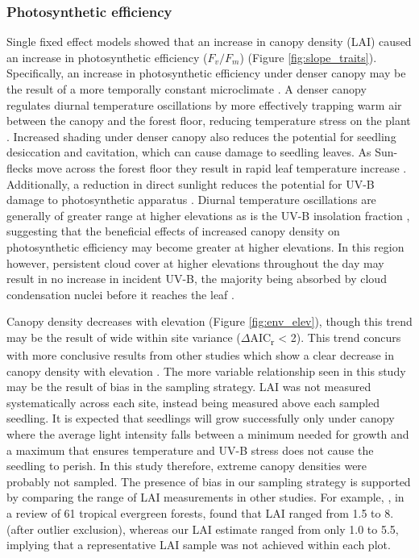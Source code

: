 \documentclass[a4paper, 11pt]{article}
\begin{document}
\subsubsection*{Photosynthetic efficiency}

Single fixed effect models showed that an increase in canopy density (LAI) caused an increase in photosynthetic efficiency ($F_v/F_m$) (Figure \ref{fig:slope_traits}). Specifically, an increase in photosynthetic efficiency under denser canopy may be the result of a more temporally constant microclimate \citep{Amissah2015}. A denser canopy regulates diurnal temperature oscillations by more effectively trapping warm air between the canopy and the forest floor, reducing temperature stress on the plant \citep{Larcher2003}. Increased shading under denser canopy also reduces the potential for seedling desiccation and cavitation, which can cause damage to seedling leaves. As Sun-flecks move across the forest floor they result in rapid leaf temperature increase \citep{Rozendaal2006, Poorter2010}. Additionally, a reduction in direct sunlight reduces the potential for UV-B damage to photosynthetic apparatus \citep{Dobrikova2013}. Diurnal temperature oscillations are generally of greater range at higher elevations \citep{Seidel2005} as is the UV-B insolation fraction \citep{Piazena1996}, suggesting that the beneficial effects of increased canopy density on photosynthetic efficiency may become greater at higher elevations. In this region however, persistent cloud cover at higher elevations throughout the day may result in no increase in incident UV-B, the majority being absorbed by cloud condensation nuclei before it reaches the leaf \citep{Flint2003}.

Canopy density decreases with elevation (Figure \ref{fig:env_elev}), though this trend may be the result of wide within site variance ($\Delta$AIC\textsubscript{r} < 2). This trend concurs with more conclusive results from other studies which show a clear decrease in canopy density with elevation \citep{Kitayama2002, Moser2008}. The more variable relationship seen in this study may be the result of bias in the sampling strategy. LAI was not measured systematically across each site, instead being measured above each sampled seedling. It is expected that seedlings will grow successfully only under canopy where the average light intensity falls between a minimum needed for growth and a maximum that ensures temperature and UV-B stress does not cause the seedling to perish. In this study therefore, extreme canopy densities were probably not sampled. The presence of bias in our sampling strategy is supported by comparing the range of LAI measurements in other studies. For example, \citet{Asner2003}, in a review of 61 tropical evergreen forests, found that LAI ranged from 1.5 to 8. (after outlier exclusion), whereas our LAI estimate ranged from only 1.0 to 5.5, implying that a representative LAI sample was not achieved within each plot.
\end{document}
